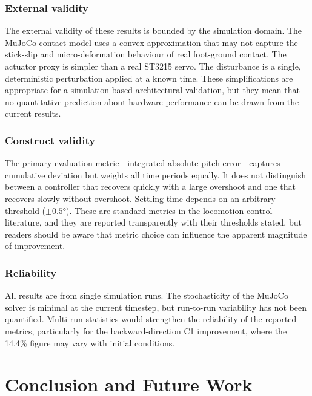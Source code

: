\documentclass[12pt,a4paper]{report}
\begin{document}
\subsection{External validity}
The external validity of these results is bounded by the simulation domain. The MuJoCo contact model uses a convex approximation that may not capture the stick-slip and micro-deformation behaviour of real foot-ground contact. The actuator proxy is simpler than a real ST3215 servo. The disturbance is a single, deterministic perturbation applied at a known time. These simplifications are appropriate for a simulation-based architectural validation, but they mean that no quantitative prediction about hardware performance can be drawn from the current results.
 
\subsection{Construct validity}
The primary evaluation metric---integrated absolute pitch error---captures cumulative deviation but weights all time periods equally. It does not distinguish between a controller that recovers quickly with a large overshoot and one that recovers slowly without overshoot. Settling time depends on an arbitrary threshold ($\pm\ang{0.5}$). These are standard metrics in the locomotion control literature, and they are reported transparently with their thresholds stated, but readers should be aware that metric choice can influence the apparent magnitude of improvement.
 
\subsection{Reliability}
All results are from single simulation runs. The stochasticity of the MuJoCo solver is minimal at the current timestep, but run-to-run variability has not been quantified. Multi-run statistics would strengthen the reliability of the reported metrics, particularly for the backward-direction C1 improvement, where the 14.4\% figure may vary with initial conditions.
 
\chapter{Conclusion and Future Work}\label{ch:conclusion}
 
\end{document}
